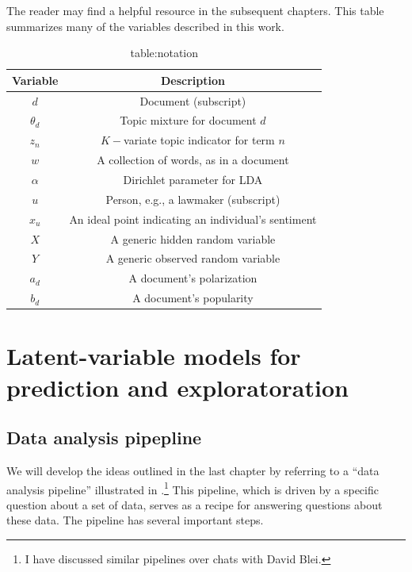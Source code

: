 The reader may find  a helpful resource in the
subsequent chapters.  This table summarizes many of the variables
described in this work.
\begin{table}
    \caption{table:notation}
    \begin{center}
      \begin{tabular}{|c|c|}
      \hline
      \textbf{Variable} & \textbf{Description} \\
      \hline
      $d$ & Document (subscript) \\
      $\theta_d$ & Topic mixture for document $d$ \\
      $z_n$ & $K-$variate topic indicator for term $n$ \\
      $w$ & A collection of words, as in a document \\
      $\alpha$ & Dirichlet parameter for LDA \\
      $u$ & Person, e.g., a lawmaker (subscript) \\
      $x_u$ & An ideal point indicating an individual's sentiment \\
      $X$ & A generic hidden random variable \\
      $Y$ & A generic observed random variable \\
      $a_d$ & A document's polarization \\
      $b_d$ & A document's popularity \\
      \hline
    \end{tabular}
    \end{center}
  \end{table}

\label{section:pipeline}

\section{Latent-variable models for prediction and exploratoration}

\subsection{Data analysis pipepline}
\label{section:data_analysis_pipeline}
We will develop the ideas outlined in the last chapter by referring to
a ``data analysis pipeline'' illustrated in
.\footnote{I have discussed similar
  pipelines over chats with David Blei.}  This pipeline, which is
driven by a specific question about a set of data, serves as a recipe
for answering questions about these data.  The pipeline has several
important steps.

